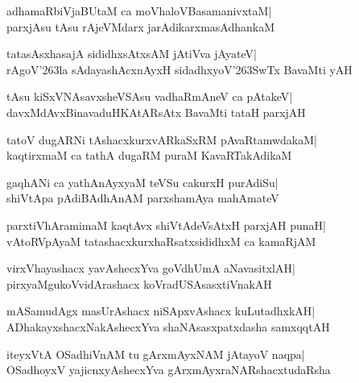 \documentclass[twoside,12pt,openright]{book}
\def\S{\char'263}
\newcounter{shloka}[chapter]
\begin{document}
\begin{shloka}%
adhamaRbiVjaBUtaM ca moVhaloVBasamanivxtaM|\\
parxjAsu tAsu rAjeVMdarx jarAdikarxmasAdhankaM
\end{shloka}

\begin{shloka}%
tatasAsxhasajA sididhxsAtxsAM jAtiVva jAyateV|\\
rAgoV\S la sAdayashAcxnAyxH sidadhxyoV\S SwTx BavaMti yAH
\end{shloka}

\begin{shloka}%
tAsu kiSxVNAsavxsheVSAsu vadhaRmAneV ca pAtakeV|\\
davxMdAvxBinavaduHKAtARsAtx BavaMti tataH parxjAH
\end{shloka}

\begin{shloka}%
tatoV dugARNi tAshacxkurxvARkaSxRM pAvaRtamwdakaM|\\
kaqtirxmaM ca tathA dugaRM puraM KavaRTakAdikaM
\end{shloka}

\begin{shloka}%
gaqhANi ca yathAnAyxyaM teVSu cakurxH purAdiSu|\\
shiVtApa pAdiBAdhAnAM parxshamAya mahAmateV
\end{shloka}

\begin{shloka}%
parxtiVhAramimaM kaqtAvx shiVtAdeVsAtxH parxjAH punaH|\\
vAtoRVpAyaM tatashacxkurxhaRsatxsididhxM ca kamaRjAM
\end{shloka}

\begin{shloka}%
virxVhayashacx yavAshecxYva goVdhUmA aNavasitxlAH|\\
pirxyaMgukoVvidArashacx koVradUSAsasxtiVnakAH
\end{shloka}

\begin{shloka}%
mASamudAgx masUrAshacx niSApxvAshacx kuLutadhxkAH|\\
ADhakayxshacxNakAshecxYva shaNAsasxpatxdasha samxqqtAH
\end{shloka}

\begin{shloka}%
iteyxVtA OSadhiVnAM tu gArxmAyxNAM jAtayoV naqpa|\\
OSadhoyxV yajicnxyAshecxYva gArxmAyxraNARshacxtudaRsha
\end{shloka}
\end{document}
